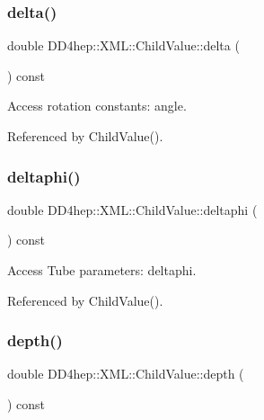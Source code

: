 \subsubsection{\texorpdfstring{delta()}{delta()}}
{\footnotesize\ttfamily double D\+D4hep\+::\+X\+M\+L\+::\+Child\+Value\+::delta (\begin{DoxyParamCaption}{ }\end{DoxyParamCaption}) const}



Access rotation constants\+: angle. 



Referenced by Child\+Value().

\hypertarget{struct_d_d4hep_1_1_x_m_l_1_1_child_value_ac94a76972641076217f5fcb112623891}{}\label{struct_d_d4hep_1_1_x_m_l_1_1_child_value_ac94a76972641076217f5fcb112623891} 
\subsubsection{\texorpdfstring{deltaphi()}{deltaphi()}}
{\footnotesize\ttfamily double D\+D4hep\+::\+X\+M\+L\+::\+Child\+Value\+::deltaphi (\begin{DoxyParamCaption}{ }\end{DoxyParamCaption}) const}



Access Tube parameters\+: deltaphi. 



Referenced by Child\+Value().

\hypertarget{struct_d_d4hep_1_1_x_m_l_1_1_child_value_a8ca412dee3914fc77e342e70a0ba89d6}{}\label{struct_d_d4hep_1_1_x_m_l_1_1_child_value_a8ca412dee3914fc77e342e70a0ba89d6} 
\subsubsection{\texorpdfstring{depth()}{depth()}}
{\footnotesize\ttfamily double D\+D4hep\+::\+X\+M\+L\+::\+Child\+Value\+::depth (\begin{DoxyParamCaption}{ }\end{DoxyParamCaption}) const}



